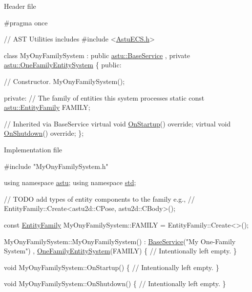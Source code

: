 Header file


\begin{DoxyCodeInclude}
\textcolor{preprocessor}{#pragma once}


\textcolor{comment}{// AST Utilities includes}
\textcolor{preprocessor}{#include <\hyperlink{AstuECS_8h}{AstuECS.h}>}

\textcolor{keyword}{class }MyOnyFamilySystem 
    : \textcolor{keyword}{public} \hyperlink{classastu_1_1BaseService}{astu::BaseService}
    , \textcolor{keyword}{private} \hyperlink{classastu_1_1OneFamilyEntitySystem}{astu::OneFamilyEntitySystem}
\{
\textcolor{keyword}{public}:

    \textcolor{comment}{// Constructor.}
    MyOnyFamilySystem();

\textcolor{keyword}{private}:
    \textcolor{comment}{// The family of entities this system processes}
    \textcolor{keyword}{static} \textcolor{keyword}{const} \hyperlink{classastu_1_1EntityFamily}{astu::EntityFamily} FAMILY;

    \textcolor{comment}{// Inherited via BaseService}
    \textcolor{keyword}{virtual} \textcolor{keywordtype}{void} \hyperlink{classastu_1_1Service_a357dc663e000b1f086f681ec3c459bfe}{OnStartup}() \textcolor{keyword}{override};
    \textcolor{keyword}{virtual} \textcolor{keywordtype}{void} \hyperlink{classastu_1_1Service_a1e1dff727df791c57fae782d8a613c5f}{OnShutdown}() \textcolor{keyword}{override};
\};
\end{DoxyCodeInclude}


Implementation file 
\begin{DoxyCodeInclude}
\textcolor{preprocessor}{#include "MyOnyFamilySystem.h"}

\textcolor{keyword}{using namespace }\hyperlink{namespaceastu}{astu};
\textcolor{keyword}{using namespace }\hyperlink{namespacestd}{std};

\textcolor{comment}{// TODO add types of entity components to the family e.g.,}
\textcolor{comment}{// EntityFamily::Create<astu2d::CPose, astu2d::CBody>();}

\textcolor{keyword}{const} \hyperlink{classastu_1_1EntityFamily}{EntityFamily} MyOnyFamilySystem::FAMILY = EntityFamily::Create<>();

MyOnyFamilySystem::MyOnyFamilySystem()
    : \hyperlink{classastu_1_1BaseService}{BaseService}(\textcolor{stringliteral}{"My One-Family System"})
    , \hyperlink{classastu_1_1OneFamilyEntitySystem}{OneFamilyEntitySystem}(FAMILY)    
\{
    \textcolor{comment}{// Intentionally left empty.}
\}

\textcolor{keywordtype}{void} MyOnyFamilySystem::OnStartup()
\{
    \textcolor{comment}{// Intentionally left empty.}
\}

\textcolor{keywordtype}{void} MyOnyFamilySystem::OnShutdown()
\{
    \textcolor{comment}{// Intentionally left empty.}
\}
\end{DoxyCodeInclude}
 

